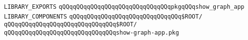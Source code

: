 \label{src/lib/x-kit/tut/show-graph/show-graph-app.lib}
\verb|LIBRARY_EXPORTS|\newline
\newline
\newline
\verb|qQQqqQQqqQQqqQQqqQQqqQQqqQQqqQQqpkgqQQqshow_graph_app|\newline
\newline
\newline
\verb|LIBRARY_COMPONENTS|\newline
\newline
\verb|qQQqqQQqqQQqqQQqqQQqqQQqqQQqqQQq$ROOT/|\newline
\verb|qQQqqQQqqQQqqQQqqQQqqQQqqQQqqQQq$ROOT/|\newline
\newline
\verb|qQQqqQQqqQQqqQQqqQQqqQQqqQQqqQQqshow-graph-app.pkg|\newline

